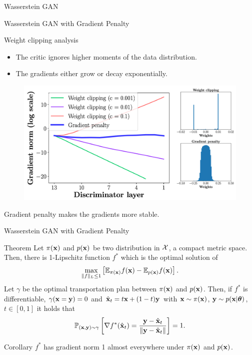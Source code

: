 \begin{frame}{Wasserstein GAN}
\end{frame}
\begin{frame}{Wasserstein GAN with Gradient Penalty}
	\begin{block}{Weight clipping analysis}
		\begin{itemize}
			\item The critic ignores higher moments of the data distribution.
			\item The gradients either grow or decay exponentially.
		\end{itemize}
	\end{block}
	\vspace{-0.2cm}
	\begin{figure}
		\centering
		\includegraphics[width=0.8\linewidth]{figs/wgan_gp_weights}
	\end{figure}
	\vspace{-0.2cm} 
	
	Gradient penalty makes the gradients  more stable.
\end{frame}
\begin{frame}{Wasserstein GAN with Gradient Penalty}
	\begin{block}{Theorem}
		Let $\pi(\mathbf{x})$ and $p(\mathbf{x})$ be two distribution in $\mathcal{X}$, a compact metric space. Then, there is 1-Lipschitz function $f^*$ which is the optimal solution of 
		\[
			\max_{\| f \|_L \leq 1} \left[ \mathbb{E}_{\pi(\mathbf{x})} f(\mathbf{x})  - \mathbb{E}_{p(\mathbf{x})} f(\mathbf{x})\right].
		\]
		Let $\gamma$ be the optimal transportation plan between $\pi(\mathbf{x})$ and $p(\mathbf{x})$. Then, if $f^*$ is differentiable, $\gamma(\mathbf{x} = \mathbf{y}) = 0$ and $\hat{\mathbf{x}}_t = t \mathbf{x} + (1 - t) \mathbf{y}$ with $\mathbf{x} \sim \pi(\mathbf{x})$, $\mathbf{y} \sim p(\mathbf{x} | \boldsymbol{\theta})$, $t \in [0, 1]$ it holds that
		\[
			\mathbb{P}_{(\mathbf{x}, \mathbf{y}) \sim \gamma} \left[ \nabla f^*(\hat{\mathbf{x}}_t) = \frac{\mathbf{y} - \hat{\mathbf{x}}_t}{\| \mathbf{y} - \hat{\mathbf{x}}_t \|} \right] = 1.
		\]
	\end{block}
	\vspace{-0.2cm}
	\begin{block}{Corollary}
		$f^*$ has gradient norm 1 almost everywhere under $\pi(\mathbf{x})$ and $p(\mathbf{x})$.
	\end{block}

\end{frame}
